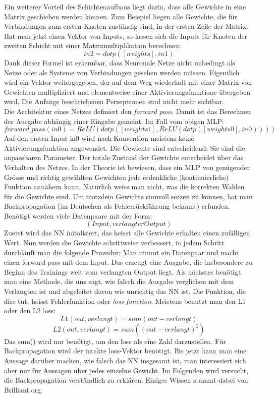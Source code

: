 \documentclass[12pt,a4paper]{article}
\begin{document}
Ein weiterer Vorteil des Schichtenaufbaus liegt darin, dass alle Gewichte in eine Matrix geschieben werden können. Zum Beispiel liegen alle Gewichte, die für Verbindungen zum ersten Knoten zuständig sind, in der ersten Zeile der Matrix. Hat man jetzt einen Vektor von Inputs, so lassen sich die Inputs für Knoten der zweiten Schicht mit einer Matrixmultiplikation berechnen: 
		$$in2 = dotp( [weights], in1)$$
Dank dieser Formel ist erkennbar, dass Neuronale Netze nicht unbedingt als Netze oder als Systeme von Verbindungen gesehen werden müssen. Eigentlich wird ein Vektor weitergegeben, der auf dem Weg wiederholt mit einer Matrix von Gewichten multipliziert und elementweise einer Aktivierungsfunktione übergeben wird. Die Anfangs beschriebenen Perzeptronen sind nicht mehr sichtbar.\\
Die Architektur eines Netzes definiert den \textit{forward pass}. Damit ist das Berechnen der Ausgabe abhängig einer Eingabe gemeint. Im Fall vom obigen MLP:
	$$forward\_pass(in0) = ReLU(dotp( [weights1],ReLU( dotp( [weights0],in0 ) ) ))$$
Auf den ersten Input in0 wird nach Konvention meistens keine Aktivierungsfunktion angewendet\cite{pinkbook}.
Die Gewichte sind entscheidend: Sie sind die anpassbaren Parameter. Der totale Zustand der Gewichte entscheidet über das Verhalten des Netzes. In der Theorie ist bewiesen, dass ein MLP von genügender Grösse und richtig gewählten Gewichten jede erdenkliche (kontinuierliche) Funktion annähern kann\cite{universalproof}.
Natürlich weiss man nicht, was die korrekten Wahlen für die Gewichte sind. Um trotzdem Gewichte sinnvoll setzen zu können, hat man Backpropagation (im Deutschen als Fehlerrückführung bekannt) erfunden.
Benötigt werden viele Datenpaare mit der Form:
	$$( Input, verlangter Output)$$
Zuerst wird das NN initalisiert, das heisst alle Gewichte erhalten einen zufälligen Wert. Nun werden die Gewichte schrittweise verbessert, in jedem Schritt durchläuft man die folgende Prozedur: Man nimmt ein Datenpaar und macht einen forward pass mit dem Input. Das erzeugt eine Ausgabe, die insbesondere zu Beginn des Trainings weit vom verlangten Output liegt. Als nächstes benötigt man eine Methode, die uns sagt, wie falsch die Ausgabe verglichen mit dem  Verlangten ist und abgeleitet davon wie unrichtig das NN ist. Die Funktion, die dies tut, heisst Fehlerfunktion oder \textit{loss function}. Meistens benutzt man den L1 oder den L2 loss\cite{video2}:
$$L1( out, verlangt ) = sum( out - verlangt )$$
$$L2( out,verlangt ) = sum( ( out - verlangt )^2 )$$
Das sum() wird nur benötigt, um den loss als eine Zahl darzustellen. Für Backpropagation wird der intakte loss-Vektor benötigt. Bis jetzt kann man eine Aussage darüber machen, wie falsch das NN insgesamt ist, man interessiert sich aber nur für Aussagen über jedes einzelne Gewicht.
Im Folgenden wird versucht, die Backpropagation verständlich zu erklären. Einiges Wissen stammt dabei von Brilliant.org\cite{backprop}.
\end{document}
